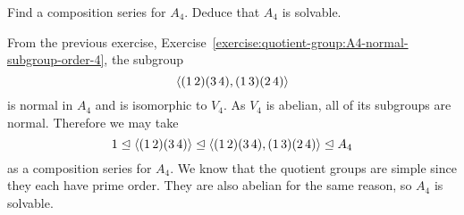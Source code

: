  Find a composition series for $A_4$. Deduce that $A_4$
is solvable.
\begin{solution}
  From the previous exercise,
  Exercise~\ref{exercise:quotient-group:A4-normal-subgroup-order-4},
  the subgroup
  \begin{equation*}
    \langle{(1\,2)(3\,4), (1\,3)(2\,4)}\rangle
  \end{equation*}
  is normal in $A_4$ and is isomorphic to $V_4$. As $V_4$ is abelian,
  all of its subgroups are normal. Therefore we may take
  \begin{equation*}
    1 \trianglelefteq \langle{(1\,2)(3\,4)}\rangle \trianglelefteq
    \langle{(1\,2)(3\,4), (1\,3)(2\,4)}\rangle \trianglelefteq A_4
  \end{equation*}
  as a composition series for $A_4$. We know that the quotient groups
  are simple since they each have prime order. They are also abelian
  for the same reason, so $A_4$ is solvable.
\end{solution}
